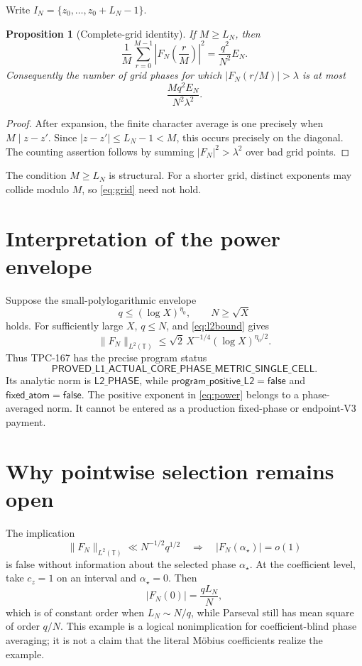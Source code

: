 \documentclass[11pt]{article}
\newtheorem{proposition}[theorem]{Proposition}
\theoremstyle{definition}
\newcommand{\T}{\mathbb T}
\newcommand{\norm}[1]{\lVert#1\rVert}
\begin{document}
Write \(I_N=\{z_0,\ldots,z_0+L_N-1\}\).

\begin{proposition}[Complete-grid identity]\label{prop:grid}
If \(M\ge L_N\), then
\begin{equation}
 \frac1M\sum_{r=0}^{M-1}
 \left|F_N\left(\frac rM\right)\right|^2
 =\frac{q^2}{N^2}E_N.
\label{eq:grid}
\end{equation}
Consequently the number of grid phases for which
\(|F_N(r/M)|>\lambda\) is at most
\[
 \frac{Mq^2E_N}{N^2\lambda^2}.
\]
\end{proposition}

\begin{proof}
After expansion, the finite character average is one precisely when
\(M\mid z-z'\).  Since \(|z-z'|\le L_N-1<M\), this occurs precisely
on the diagonal.  The counting assertion follows by summing
\(|F_N|^2>\lambda^2\) over bad grid points.
\end{proof}

The condition \(M\ge L_N\) is structural.  For a shorter grid,
distinct exponents may collide modulo \(M\), so \eqref{eq:grid} need
not hold.

\section{Interpretation of the power envelope}

Suppose the small-polylogarithmic envelope
\[
 q\le(\log X)^{\eta_0},\qquad N\ge\sqrt X
\]
holds.  For sufficiently large \(X\), \(q\le N\), and
\eqref{eq:l2bound} gives
\begin{equation}
 \boxed{\quad
 \norm{F_N}_{L^2(\T)}
 \le\sqrt2\,X^{-1/4}(\log X)^{\eta_0/2}.
 \quad}
\label{eq:power}
\end{equation}
Thus TPC-167 has the precise program status
\[
 \mathsf{PROVED\_L1\_ACTUAL\_CORE\_
 PHASE\_METRIC\_SINGLE\_CELL}.
\]
Its analytic norm is \(\mathsf{L2\_PHASE}\), while
\(\mathsf{program\_positive\_L2=false}\) and
\(\mathsf{fixed\_atom=false}\).  The positive exponent in
\eqref{eq:power} belongs to a phase-averaged norm.  It cannot be
entered as a production fixed-phase or endpoint-V3 payment.

\section{Why pointwise selection remains open}

The implication
\[
 \norm{F_N}_{L^2(\T)}\ll N^{-1/2}q^{1/2}
 \quad\Longrightarrow\quad
 |F_N(\alpha_\star)|=o(1)
\]
is false without information about the selected phase
\(\alpha_\star\).  At the coefficient level, take \(c_z=1\) on an
interval and \(\alpha_\star=0\).  Then
\[
 |F_N(0)|=\frac{qL_N}{N},
\]
which is of constant order when \(L_N\sim N/q\), while Parseval still
has mean square of order \(q/N\).  This example is a logical
nonimplication for coefficient-blind phase averaging; it is not a
claim that the literal M\"obius coefficients realize the example.
\end{document}
